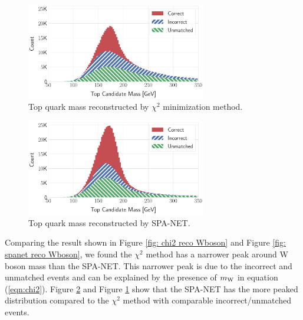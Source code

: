 \begin{figure}[H]
	\centering
	\includegraphics[width=0.7\textwidth]{Figures/network_t_quark_stacked_chi2.pdf}
	\caption{ Top quark mass reconstructed by $\chi^{2}$ minimization method.}
	\label{fig: chi2 reco t quark}
\end{figure}
\begin{figure}[H]
	\centering
	\includegraphics[width=0.7\textwidth]{Figures/network_t_quark_stacked.pdf}
	\caption{ Top quark mass reconstructed by SPA-NET.}
	\label{fig: spanet reco t quark}
\end{figure}
Comparing the result shown in Figure \ref{fig: chi2 reco Wboson} and Figure \ref{fig: spanet reco Wboson}, we found the $\chi^{2}$ method has a narrower peak around W boson mass than the SPA-NET. This narrower peak is due to the incorrect and unmatched events and can be explained by the presence of $m_{\rm W}$ in equation (\ref{eqn:chi2}). Figure \ref{fig: spanet reco t quark} and Figure \ref{fig: chi2 reco t quark} show that the SPA-NET has the more peaked distribution compared to the $\chi^{2}$ method with comparable incorrect/unmatched events.

